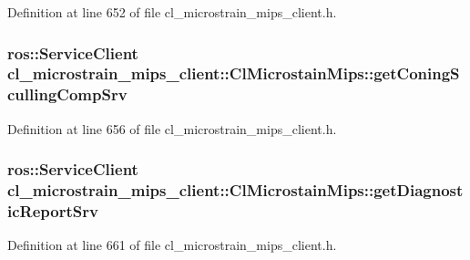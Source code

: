Definition at line 652 of file cl\+\_\+microstrain\+\_\+mips\+\_\+client.\+h.

\subsubsection[{\texorpdfstring{get\+Coning\+Sculling\+Comp\+Srv}{getConingScullingCompSrv}}]{\setlength{\rightskip}{0pt plus 5cm}ros\+::\+Service\+Client cl\+\_\+microstrain\+\_\+mips\+\_\+client\+::\+Cl\+Microstain\+Mips\+::get\+Coning\+Sculling\+Comp\+Srv\hspace{0.3cm}{\ttfamily [protected]}}\hypertarget{classcl__microstrain__mips__client_1_1ClMicrostainMips_a55089b40c0c56c4d3186f84c1f5fb5ad}{}\label{classcl__microstrain__mips__client_1_1ClMicrostainMips_a55089b40c0c56c4d3186f84c1f5fb5ad}


Definition at line 656 of file cl\+\_\+microstrain\+\_\+mips\+\_\+client.\+h.

\subsubsection[{\texorpdfstring{get\+Diagnostic\+Report\+Srv}{getDiagnosticReportSrv}}]{\setlength{\rightskip}{0pt plus 5cm}ros\+::\+Service\+Client cl\+\_\+microstrain\+\_\+mips\+\_\+client\+::\+Cl\+Microstain\+Mips\+::get\+Diagnostic\+Report\+Srv\hspace{0.3cm}{\ttfamily [protected]}}\hypertarget{classcl__microstrain__mips__client_1_1ClMicrostainMips_a63f2304a6fd551e814f9c4906e2b92aa}{}\label{classcl__microstrain__mips__client_1_1ClMicrostainMips_a63f2304a6fd551e814f9c4906e2b92aa}


Definition at line 661 of file cl\+\_\+microstrain\+\_\+mips\+\_\+client.\+h.

